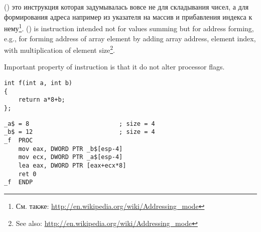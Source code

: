 ﻿\section{}
\label{sec:LEA}

\newcommand{\URLAM}{\url{http://en.wikipedia.org/wiki/Addressing_mode}}

\IFRU
{\LEA () это инструкция которая задумывалась вовсе не для складывания чисел, 
а для формирования адреса например из указателя на массив и прибавления индекса к нему\footnote{См. также: \URLAM}.}
{\LEA () is instruction intended not for values summing but for address forming, 
e.g., for forming address of array element by adding array address, element index, with 
multiplication of element size\footnote{See also: \URLAM}.}

{Important property of \LEA instruction is that it do not alter processor flags.}


\begin{lstlisting}
int f(int a, int b)
{
	return a*8+b;
};
\end{lstlisting}


\begin{lstlisting}
_a$ = 8							; size = 4
_b$ = 12						; size = 4
_f	PROC
	mov	eax, DWORD PTR _b$[esp-4]
	mov	ecx, DWORD PTR _a$[esp-4]
	lea	eax, DWORD PTR [eax+ecx*8]
	ret	0
_f	ENDP
\end{lstlisting}
